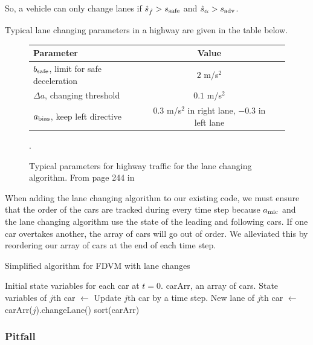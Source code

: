 \documentclass[12pt]{article}
\begin{document}
      So, a vehicle can only change lanes if $\hat s_{\hat f} > s_{\rm safe}$ and $\hat s_{\alpha} > s_{\rm adv}$. 

      Typical lane changing parameters in a highway are given in the table below. 
      \begin{figure}[H]
        \begin{center}
          \begin{tabular}{l c c } 
          Parameter & Value \\
          \hline
          $b_{\rm safe}$, limit for safe deceleration & $2$ m/s$^2$ \\
          $\Delta a$, changing threshold & $0.1$ m/s$^2$ \\
          $a_{\rm bias}$, keep left directive & $0.3$ m/s$^2$ in right lane, $-0.3$ in left lane \\

          \end{tabular}
          \end{center}
          \caption{Typical parameters for highway traffic for the lane changing algorithm. From page 244 in \cite{traffic}}.
      \end{figure}

      When adding the lane changing algorithm to our existing code, we must ensure that the order of the cars are tracked during every time step because $a_{\rm mic}$ and the lane changing algorithm use the state of the leading and following cars. If one car overtakes another, the array of cars will go out of order. We alleviated this by reordering our array of cars at the end of each time step.  
      \begin{algorithm}
        \caption{Simplified algorithm for FDVM with lane changes}\label{alg:car-following-lane}
        \begin{algorithmic}
        \Require Initial state variables for each car at $t=0$. 
        \Require carArr, an array of cars.
          \State State variables of $j$th car $\gets$ Update $j$th car by a time step.
          \State New lane of $j$th car $\gets$ carArr($j$).changeLane()
          \EndFor
          \State sort(carArr)
        \EndFor
        \end{algorithmic}
        \end{algorithm}
    \subsubsection{Pitfall} \label{lane change pitfalls}
\end{document}
